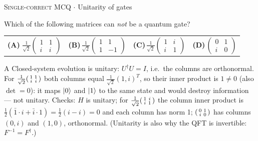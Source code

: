 \documentclass[11pt,a4paper]{article}
\newcommand{\optlabel}[1]{\textbf{(#1)}}
\newcommand{\correctlabel}[1]{\textcolor{okgreen}{\textbf{(#1)}\,\ding{51}}}
\newenvironment{qitem}[1]{\begin{list}{}{\setlength{\leftmargin}{3.3em}\setlength{\labelwidth}{3.1em}%
  \setlength{\labelsep}{0.2em}\setlength{\topsep}{3pt}\setlength{\parsep}{3pt}}\item[\textbf{Q.#1}\hfill]}{\end{list}}
\newcommand{\qsep}{\par\vspace{2pt}{\color{black!15}\hrule}\vspace{4pt}}
\newcommand{\qmeta}[2]{{\footnotesize\color{black!60}\textsc{#1} \;$\cdot$\; #2}\par}
\begin{document}
\begin{qitem}{30}
\qmeta{Single-correct MCQ}{Unitarity of gates}
Which of the following matrices can \emph{not} be a quantum gate?
\par\smallskip\noindent\begin{tabularx}{\linewidth}{@{}*{4}{L}@{}}
\correctlabel{A}\,$\frac{1}{\sqrt2}\begin{pmatrix}1&1\\ i&i\end{pmatrix}$ & \optlabel{B}\,$\frac{1}{\sqrt2}\begin{pmatrix}1&1\\ 1&-1\end{pmatrix}$ & \optlabel{C}\,$\frac{1}{\sqrt2}\begin{pmatrix}1&i\\ i&1\end{pmatrix}$ & \optlabel{D}\,$\begin{pmatrix}0&1\\ i&0\end{pmatrix}$
\end{tabularx}
\end{qitem}
\begin{solbox}{A}
Closed-system evolution is unitary: $U^\dagger U = I$, i.e.\ the columns are orthonormal.
For $\frac{1}{\sqrt2}\begin{psmallmatrix}1&1\\ i&i\end{psmallmatrix}$ both columns equal $\frac{1}{\sqrt2}(1, i)^T$, so their inner
product is $1 \neq 0$ (also $\det = 0$): it maps $\ket0$ and $\ket1$ to the same state and would destroy information --- not unitary.
Checks: $H$ is unitary; for $\frac{1}{\sqrt2}\begin{psmallmatrix}1&i\\ i&1\end{psmallmatrix}$ the column inner product is
$\frac12(\bar1\cdot i + \bar i\cdot 1) = \frac12(i - i) = 0$ and each column has norm 1; $\begin{psmallmatrix}0&1\\ i&0\end{psmallmatrix}$ has
columns $(0, i)$ and $(1, 0)$, orthonormal. (Unitarity is also why the QFT is invertible: $F^{-1} = F^\dagger$.)
\end{solbox}
\qsep
\end{document}

